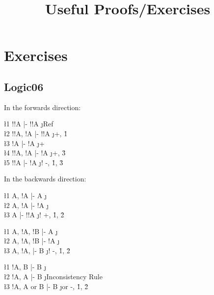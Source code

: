 \documentclass[class=cs245,leqno]{agony}
\title{Useful Proofs/Exercises}
\begin{document}
\section{Exercises}
\subsection{Logic06}
\begin{theorem}
\end{theorem}
\begin{prf}
  In the forwards direction:
  \begin{deduce}
    \l1 !!A     |- !!A \j {Ref}           \\
    \l2 !!A, !A |- !!A \j {+, \r1}        \\
    \l3 !A      |- !A  \j {+}             \\
    \l4 !!A, !A |- !A  \j {+, \r3}        \\
    \l5 !!A     |- !A  \j {! -, \r1, \r3}
  \end{deduce}
  In the backwards direction:
  \begin{deduce}
    \l1 A, !A |- A   \j {\E}            \\
    \l2 A, !A |- !A  \j {\E}            \\
    \l3 A     |- !!A \j {! +, \r1, \r2}
  \end{deduce}
\end{prf}

\begin{theorem}
\end{theorem}
\begin{prf}
  \begin{deduce}
    \l1 A, !A, !B |- A  \j {\E}            \\
    \l2 A, !A, !B |- !A \j {\E}            \\
    \l3 A, !A,    |- B  \j {! -, \r1, \r2}
  \end{deduce}
\end{prf}

\begin{theorem}
\end{theorem}
\begin{prf}
  \begin{deduce}
    \l1 !A, B      |- B \j {\E}                 \\
    \l2 !A, A      |- B \j {Inconsistency Rule} \\
    \l3 !A, A or B |- B \j {or -, \r1, \r2}
  \end{deduce}
\end{prf}
\end{document}
